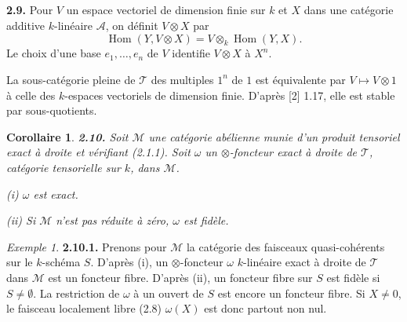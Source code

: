 \documentclass[12pt,a4paper]{article}
\theoremstyle{plain}
\newtheorem{corollary}[theorem]{Corollaire}
\theoremstyle{definition}
\theoremstyle{remark}
\newtheorem{example}[theorem]{Exemple}
\DeclareMathOperator{\Hom}{Hom}
\begin{document}
\subsection{}

\textbf{2.9.} Pour $V$ un espace vectoriel de dimension finie sur $k$ et $X$ dans une catégorie additive $k$-linéaire $\mathcal{A}$, on définit $V \otimes X$ par
\[
\Hom(Y, V \otimes X) = V \otimes_k \Hom(Y,X).
\]
Le choix d'une base $e_1, \ldots, e_n$ de $V$ identifie $V \otimes X$ à $X^n$.

La sous-catégorie pleine de $\mathcal{T}$ des multiples $1^n$ de $1$ est équivalente par $V \mapsto V \otimes 1$ à celle des $k$-espaces vectoriels de dimension finie. D'après [2] 1.17, elle est stable par sous-quotients.

\begin{corollary}\label{cor:2.10}
\textbf{2.10.} Soit $\mathcal{M}$ une catégorie abélienne munie d'un produit tensoriel exact à droite et vérifiant (2.1.1). Soit $\omega$ un $\otimes$-foncteur exact à droite de $\mathcal{T}$, catégorie tensorielle sur $k$, dans $\mathcal{M}$.

\emph{(i)} $\omega$ est exact.

\emph{(ii)} Si $\mathcal{M}$ n'est pas réduite à zéro, $\omega$ est fidèle.
\end{corollary}

\begin{example}
\textbf{2.10.1.} Prenons pour $\mathcal{M}$ la catégorie des faisceaux quasi-cohérents sur le $k$-schéma $S$. D'après (i), un $\otimes$-foncteur $\omega$ $k$-linéaire exact à droite de $\mathcal{T}$ dans $\mathcal{M}$ est un foncteur fibre. D'après (ii), un foncteur fibre sur $S$ est fidèle si $S \neq \emptyset$. La restriction de $\omega$ à un ouvert de $S$ est encore un foncteur fibre. Si $X \neq 0$, le faisceau localement libre (2.8) $\omega(X)$ est donc partout non nul.
\end{example}
\end{document}
